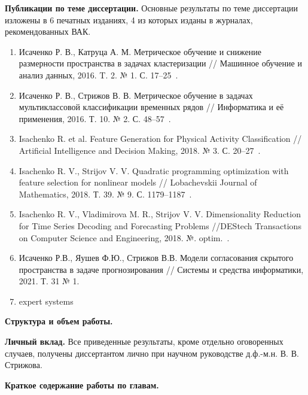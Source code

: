 \vspace{0.5cm}
\textbf{Публикации по теме диссертации.}
Основные результаты по теме диссертации изложены в 6 печатных изданиях, 4 из которых изданы в журналах, рекомендованных ВАК.

\begin{enumerate}
	\item Исаченко Р. В., Катруца А. М. Метрическое обучение и снижение размерности пространства в задачах кластеризации // Машинное обучение и анализ данных, 2016. T. 2. № 1. С. 17--25~\cite{isachenko2016metricjmlda}.
	\item Исаченко Р. В., Стрижов В. В. Метрическое обучение в задачах мультиклассовой классификации временных рядов // Информатика и её применения, 2016. Т. 10. № 2. С. 48--57~\cite{isachenko2016metricia}.
	\item Isachenko R. et al. Feature Generation for Physical Activity Classification // Artificial Intelligence and Decision Making, 2018. № 3. С. 20--27~\cite{isachenko2018feature}.
	\item Isachenko R. V., Strijov V. V. Quadratic programming optimization with feature selection for nonlinear models // Lobachevskii Journal of Mathematics, 2018. Т. 39. № 9. С. 1179--1187~\cite{isachenko2018quadratic}.
	\item Isachenko R. V., Vladimirova M. R., Strijov V. V. Dimensionality Reduction for Time Series Decoding and Forecasting Problems //DEStech Transactions on Computer Science and Engineering, 2018. №. optim.~\cite{isachenko2018plsdestech}.
	\item Исаченко Р.В., Яушев Ф.Ю., Стрижов В.В. Модели согласования скрытого пространства в задаче прогнозирования // Системы и средства информатики, 2021. Т. 31 № 1.~\cite{isachenko2021concordance}
	\item {\color{red} expert systems}
\end{enumerate}

\vspace{0.5cm}
\textbf{Структура и объем работы.}

\vspace{0.5cm}
\textbf{Личный вклад.}
Все приведенные результаты, кроме отдельно оговоренных случаев, получены диссертантом лично при научном руководстве д.ф.-м.н. В. В. Стрижова.

\vspace{0.5cm}
\textbf{Краткое содержание работы по главам.}